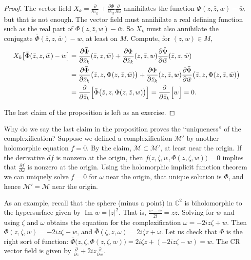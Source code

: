 \documentclass[12pt,openany]{book}
\renewcommand{\Im}{\operatorname{Im}}
\newcommand{\sabs}[1]{\lvert {#1} \rvert}
\newcommand{\C}{{\mathbb{C}}}
\newcommand{\sM}{{\mathscr{M}}}
\theoremstyle{plain}
\theoremstyle{remark}
\theoremstyle{definition}
\theoremstyle{exercise}
\theoremstyle{example}
\begin{document}
\begin{proof}
The vector field
$X_k = \frac{\partial}{\partial \bar{z}_k}
+\frac{\partial \Phi}{\partial \bar{z}_k} \frac{\partial}{\partial \omega}$
annihilates
the function $\Phi(z,\bar{z},w)-\bar{w}$, but that is not enough.
The vector field must annihilate a real defining function such as the
real part of $\Phi(z,\bar{z},w)-\bar{w}$.  So $X_k$ must also
annihilate the conjugate
$\bar{\Phi}(\bar{z},z,\bar{w})-w$, at least on $M$.  Compute, for $(z,w) \in M$,
\begin{equation*}
\begin{split}
X_k \bigl[\bar{\Phi}(\bar{z},z,\bar{w})-w\bigr]
&=
\frac{\partial \bar{\Phi}}{\partial \bar{z}_k}
{(\bar{z},z,\bar{w})}
+
\frac{\partial \Phi}{\partial \bar{z}_k}
{(z,\bar{z},w)}
\frac{\partial \bar{\Phi}}{\partial \bar{w}}
{(\bar{z},z,\bar{w})}
\\
& =
\frac{\partial \bar{\Phi}}{\partial \bar{z}_k}
{\bigl(\bar{z},z,\Phi(z,\bar{z},\bar{w})\bigr)}
+
\frac{\partial \Phi}{\partial \bar{z}_k}
{(z,\bar{z},w)}
\frac{\partial \bar{\Phi}}{\partial \bar{w}}
{\bigl(\bar{z},z,\Phi(z,\bar{z},\bar{w})\bigr)}
\\
& =
\frac{\partial}{\partial \bar{z}_k}
\Bigl[
\bar{\Phi}\bigl(\bar{z},z,\Phi(z,\bar{z},w)\bigr)
\Bigr]
=
\frac{\partial}{\partial \bar{z}_k}
\Bigl[
w
\Bigr]
= 0 .
\end{split}
\end{equation*}

The last claim of the proposition is left as an exercise.
\end{proof}

Why do we say the last claim in the proposition
proves the ``uniqueness'' of the complexification?
Suppose we defined a complexification $\sM'$ by another holomorphic
equation $f=0$.
By the claim, $\sM \subset \sM'$, at least near the origin.
If the derivative $df$ is nonzero at the origin, then
$f\bigl(z,\zeta,w,\Phi(z,\zeta,w)\bigr) = 0$ implies that
$\frac{\partial f}{\partial \omega}$ is nonzero at the origin.
Using the holomorphic implicit function theorem we can uniquely solve $f=0$
for $\omega$ near the origin, that unique solution is $\Phi$,
and hence $\sM' = \sM$ near the origin.

As an example, recall that the sphere (minus a point) in $\C^2$ is biholomorphic to the
hypersurface
given by $\Im w = \sabs{z}^2$.  That is, $\frac{w-\bar{w}}{2i} = z \bar{z}$.  Solving for
$\bar{w}$ and using $\zeta$ and $\omega$ obtains the equation for the
complexification $\omega = -2iz \zeta + w$.  Then
$\Phi(z,\zeta,w) =
-2iz \zeta + w$, and
$\bar{\Phi}(\zeta,z,\omega) = 2i\zeta z + \omega$.  Let us check
that $\Phi$ is the right sort of function:
$\bar{\Phi}\bigl(z,\zeta,\Phi(z,\zeta,w)\bigr)
=
2i\zeta z + (-2i z \zeta + w) = w$.  The CR vector field is
given by
$\frac{\partial}{\partial \bar{z}}
+2i z \frac{\partial}{\partial \bar{w}}$.
\end{document}
